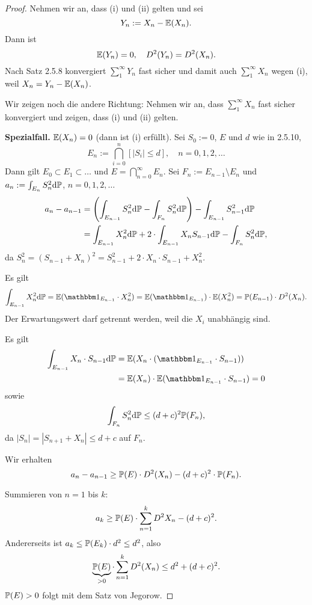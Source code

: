 \begin{proof}
  Nehmen wir an, dass (i) und (ii) gelten und sei
  \[ Y_n := X_n - \mathbb{E}(X_n). \]
  Dann ist
  \[ \mathbb{E}( Y_n ) = 0, \quad D^2(Y_n) = D^2(X_n). \]
  Nach Satz 2.5.8 konvergiert $\sum_1^\infty Y_n$ fast sicher und damit auch
  $\sum_1^\infty X_n$ wegen (i), weil $X_n = Y_n - \mathbb{E}(X_n)$.

  Wir zeigen noch die andere Richtung: Nehmen wir an, dass $\sum_1^\infty X_n$
  fast sicher konvergiert und zeigen, dass (i) und (ii) gelten.

  \textbf{Spezialfall.} $\mathbb{E}(X_n) = 0$ (dann ist (i) erfüllt). Sei $S_0 := 0$,
  $E$ und $d$ wie in 2.5.10,
  \[ E_n := \bigcap_{i=0}^n [|S_i| \le d], \quad n = 0, 1, 2, \ldots \]
  Dann gilt $E_0 \subset E_1 \subset \ldots$ und $E = \bigcap_{n=0}^\infty E_n$.
  Sei $F_n := E_{n-1} \setminus E_n$ und  $a_n := \int_{E_n} S_n^2 \mathrm{d} \mathbb{P}$,
  $n = 0, 1, 2, \ldots$
  \begin{align*}
    a_n - a_{n-1}
    &= \left( \int_{E_{n-1}} S_n^2 \mathrm{d} \mathbb{P} - \int_{F_n} S_n^2 \mathrm{d} \mathbb{P} \right)
      - \int_{E_{n-1}} S_{n-1}^2 \mathrm{d} \mathbb{P} \\
    &= \int_{E_{n-1}} X_n^2 \mathrm{d} \mathbb{P} + 2 \cdot \int_{E_{n-1}} X_n S_{n-1} \mathrm{d} \mathbb{P}
      - \int_{F_n} S_n^2 \mathrm{d} \mathbb{P},
  \end{align*}
  da $S_n^2 = (S_{n-1} + X_n)^2 = S_{n-1}^2 + 2 \cdot X_n \cdot S_{n-1} +
  X_n^2$.

  Es gilt
  \[ \int_{E_{n-1}} X_n^2 \diffop \pP = \pE( \ind_{E_{n-1}} \cdot X_n^2) = \pE(
    \ind_{E_{n-1}}) \cdot \pE(X_n^2) = \pP( E_{n-1} ) \cdot D^2(X_n). \]
  Der Erwartungswert darf getrennt werden, weil die $X_i$ unabhängig sind.

  Es gilt
  \begin{align*}
    \int_{E_{n-1}} X_n \cdot S_{n-1} \diffop \pP
    &= \pE( X_n \cdot ( \ind_{E_{n-1}} \cdot S_{n-1})) \\
    &= \pE( X_n ) \cdot \pE( \ind_{E_{n-1}} \cdot S_{n-1}) = 0
  \end{align*}
  sowie
  \[ \int_{F_n} S_n^2 \mathrm{d} \mathbb{P} \le (d+c)^2 \mathbb{P}(F_n), \]
  da $|S_n| = |S_{n+1} + X_n| \le d+c$ auf $F_n$.

  Wir erhalten
  \[a_n - a_{n-1} \ge \mathbb{P}(E) \cdot D^2(X_n) - (d+c)^2 \cdot \mathbb{P}(F_n). \]

  Summieren von $n=1$ bis $k$:
  \[ a_k \ge \mathbb{P}(E) \cdot \sum_{n=1}^k D^2 X_n - (d+c)^2. \]
  Andererseits ist $a_k \le \mathbb{P}(E_k) \cdot d^2 \le d^2$, also
  \[ \underbrace{\mathbb{P}(E)}_{> 0} \cdot \sum_{n=1}^k D^2 (X_n) \le d^2 + (d+c)^2. \]
  $\mathbb{P}(E) > 0$ folgt mit dem Satz von Jegorow.
  

\end{proof}
